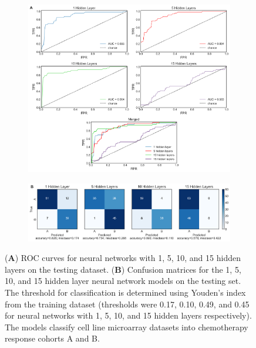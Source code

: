 \documentclass[10pt, letterpaper, twocolumn]{article}
\begin{document}
\begin{figure}[!ht]
	\centering
	\begin{subfigure}[t]{\textwidth}
		\centering
		\includegraphics[width=\textwidth]{Figures/roc/final_roc.png}
	\end{subfigure}
	
	\begin{subfigure}[t]{\textwidth}
		\centering
		\includegraphics[width=\textwidth]{Figures/confusion_matrix/fcm_combined.png}
	\end{subfigure}
	
	\caption{(\textbf{A}) ROC curves for neural networks with 1, 5, 10, and 15 hidden layers on the testing dataset. (\textbf{B}) Confusion matrices for the 1, 5, 10, and 15 hidden layer neural network models on the testing set. The threshold for classification is determined using Youden's index from the training dataset (thresholds were 0.17, 0.10, 0.49, and 0.45 for neural networks with 1, 5, 10, and 15 hidden layers respectively). The models classify cell line microarray datasets into chemotherapy response cohorts A and B.}
	\label{fig:nnet}
\end{figure}
\end{document}
